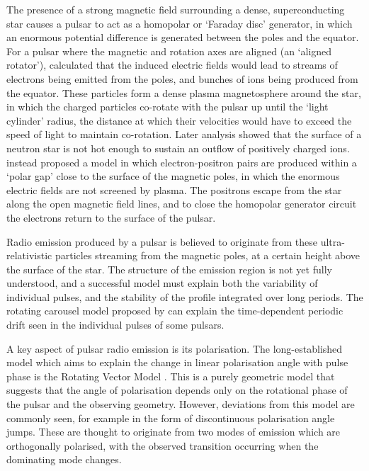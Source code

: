 The presence of a strong magnetic field surrounding a dense, superconducting star causes a pulsar to act as a homopolar or `Faraday disc' generator, in which an enormous potential difference is generated between the poles and the equator. For a pulsar where the magnetic and rotation axes are aligned (an `aligned rotator'), \citet{GJxx1969} calculated that the induced electric fields would lead to streams of electrons being emitted from the poles, and bunches of ions being produced from the equator. These particles form a dense plasma magnetosphere around the star, in which the charged particles co-rotate with the pulsar up until the `light cylinder' radius, the distance at which their velocities would have to exceed the speed of light to maintain co-rotation. Later analysis showed that the surface of a neutron star is not hot enough to sustain an outflow of positively charged ions. \citet{RSxx1975} instead proposed a model in which electron-positron pairs are produced within a `polar gap' close to the surface of the magnetic poles, in which the enormous electric fields are not screened by plasma. The positrons escape from the star along the open magnetic field lines, and to close the homopolar generator circuit the electrons return to the surface of the pulsar.

Radio emission produced by a pulsar is believed to originate from these ultra-relativistic particles streaming from the magnetic poles, at a certain height above the surface of the star. The structure of the emission region is not yet fully understood, and a successful model must explain both the variability of individual pulses, and the stability of the profile integrated over long periods. The rotating carousel model proposed by \citet{RSxx1975} can explain the time-dependent periodic drift seen in the individual pulses of some pulsars.  %

A key aspect of pulsar radio emission is its polarisation. The long-established model which aims to explain the change in linear polarisation angle with pulse phase is the Rotating Vector Model \citep[RVM;][]{RCxx1969}. This is a purely geometric model that suggests that the angle of polarisation depends only on the rotational phase of the pulsar and the observing geometry. However, deviations from this model are commonly seen, for example in the form of discontinuous polarisation angle jumps. These are thought to originate from two modes of emission which are orthogonally polarised, with the observed transition occurring when the dominating mode changes.

